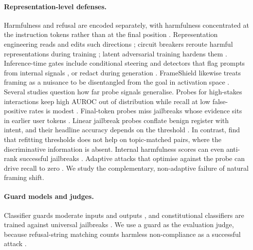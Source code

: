 \documentclass[11pt]{article}
\begin{document}
\paragraph{Representation-level defenses.}
Harmfulness and refusal are encoded separately, with harmfulness concentrated at the instruction tokens rather than at the final position \citep{zhao2025harmfulness}. Representation engineering reads and edits such directions \citep{zou2023repe}; circuit breakers reroute harmful representations during training \citep{zou2024circuitbreakers}; latent adversarial training hardens them \citep{sheshadri2024lat}. Inference-time gates include conditional steering \citep{lee2025cast} and detectors that flag prompts from internal signals \citep{zhang2025jbshield,hu2024gradientcuff,xie2024gradsafe}, or redact during generation \citep{mei2026hiddenguard}. FrameShield likewise treats framing as a nuisance to be disentangled from the goal in activation space \citep{farzam2026hiding}. Several studies question how far probe signals generalise. Probes for high-stakes interactions keep high AUROC out of distribution while recall at low false-positive rates is modest \citep{mckenzie2025highstakes}. Final-token probes miss jailbreaks whose evidence sits in earlier user tokens \citep{doda2026beforelast}. Linear jailbreak probes conflate benign register with intent, and their headline accuracy depends on the threshold \citep{kim2026linearly}. In contrast, \citet{schwarz2026entanglement} find that refitting thresholds does not help on topic-matched pairs, where the discriminative information is absent. Internal harmfulness scores can even anti-rank successful jailbreaks \citep{luo2026measuring}. Adaptive attacks that optimise against the probe can drive recall to zero \citep{bailey2026obfuscated}. We study the complementary, non-adaptive failure of natural framing shift.

\paragraph{Guard models and judges.}
Classifier guards moderate inputs and outputs \citep{inan2023llamaguard,han2024wildguard,zeng2024shieldgemma,padhi2025graniteguardian,qwen2025qwen3guard}, and constitutional classifiers are trained against universal jailbreaks \citep{sharma2025constitutional}. We use a guard as the evaluation judge, because refusal-string matching counts harmless non-compliance as a successful attack \citep{souly2024strongreject}.
\end{document}
